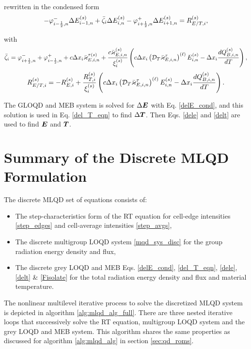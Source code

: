 	rewritten in the condensed form
	\begin{equation}
		- \varphi_{i-\frac{1}{2},n}^{-}\Delta E_{i-1,n}^{\left( s\right)} + \bar{\zeta}_{i}\Delta E_{i,n}^{\left( s\right)} - \varphi_{i+\frac{1}{2},n}^{+}\Delta E_{i+1,n}^{\left( s\right)} =  R_{E/T,i}^{\left( s\right)}, \label{delE_cond}
	\end{equation}
	
	with
	\begin{equation}
		\bar{\zeta}_{i} = \varphi_{i+\frac{1}{2},n}^{-} + \varphi_{i-\frac{1}{2},n}^{+} + c\Delta x_{i}\bar{\varkappa}_{E,i,n}^{\tau\left( s\right)} \\+ \frac{c\bar{\varkappa}_{E,i,n}^{\left( s\right)}}{\xi_{i}^{\left( s\right)}}\left( c\Delta x_{i} \left(\mathcal{D}_T \bar{\varkappa}_{E,i,n}^{\tau}\right)^{\left(\ell\right)}E_{i,n}^{\left( s\right)}- \Delta x_{i} \frac{dQ_{B,i,n}^{\left( s\right)}}{dT}\right),
	\end{equation}
	\begin{equation}
		R_{E/T,i}^{\left( s\right)} = -R_{E,i}^{\left( s\right)} + \frac{R_{T,i}^{\left( s\right)}}{\xi_{i}^{\left( s\right)}}\left( c\Delta x_{i} \left(\mathcal{D}_T \bar{\varkappa}_{E,i,n}^{\tau}\right)^{\left(\ell\right)}E_{i,n}^{\left( s\right)}- \Delta x_{i} \frac{dQ_{B,i,n}^{\left( s\right)}}{dT}\right).
	\end{equation}
	
	The GLOQD and MEB system is solved for $\Delta \bm{E}$ with Eq. \eqref{delE_cond}, and this solution is used in Eq. \eqref{del_T_eqn} to find $\Delta \bm{T}$. Then Eqs. \eqref{dele} and \eqref{delt} are used to find $\bm{E}$ and $\bm{T}$.
	
\section{Summary of the Discrete MLQD Formulation}
	The discrete MLQD set of equations consists of:
	\begin{itemize}
		\item The step-characteristics form of the RT equation for cell-edge intensities \eqref{step_edges} and cell-average intensities \eqref{step_avgs},
		\item The discrete multigroup LOQD system \eqref{mqd_sys_disc} for the group radiation energy density and flux,
		\item The discrete grey LOQD and MEB Eqs. \eqref{delE_cond}, \eqref{del_T_eqn}, \eqref{dele}, \eqref{delt} \& \eqref{Fisolate} for the total radiation energy density and flux and material temperature.
	\end{itemize}

	The nonlinear multilevel iterative process to solve the discretized MLQD system is depicted in algorithm \ref{alg:mlqd_alg_full}. There are three nested iterative loops that successively solve the RT equation, multigroup LOQD system and the grey LOQD and MEB system. This algorithm shares the same properties as discussed for algorithm \ref{alg:mlqd_alg} in section \ref{sec:qd_roms}.
	
